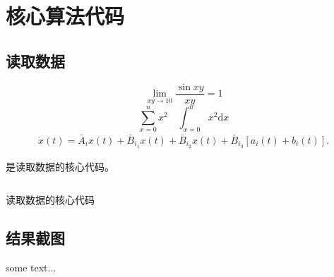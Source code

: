 \appendixs

\chapter{核心算法代码}
\section{读取数据}

\begin{equation}
\lim\limits_{xy\to 10}\frac{\sin xy}{xy} = 1
\end{equation}
\begin{equation}
\sum_{x=0}^{n}x^2\quad \int_{x=0}^{n}x^2 \mathrm{d}x
\end{equation}
\begin{eqnarray} 
\dot{x}(t)=\bar{A}_{i}x(t)+\bar{B}_{i_{1}}x(t)+\bar{B}_{i_{2}}x(t)+\bar{B}_{i_{3}}[a_{i}(t)+b_{i}(t)].
\end{eqnarray}


是读取数据的核心代码。

\begin{spacing}{1}
\begin{listing}[ht]
	\inputminted{c++}{code/main.cpp}
	\caption{读取数据的核心代码}
	\label{listing:3}
\end{listing}
\end{spacing}


\section{结果截图}
	some text... 


\cleardoublepage